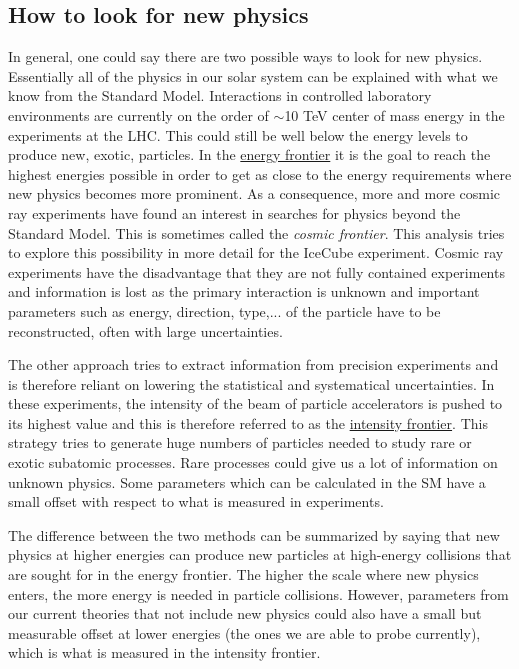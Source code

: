 \subsection{How to look for new physics}
In general, one could say there are two possible ways to look for new physics. Essentially all of the physics in our solar system can be explained with what we know from the Standard Model. Interactions in controlled laboratory environments are currently on the order of $\sim$10 TeV center of mass energy in the experiments at the LHC. This could still be well below the energy levels to produce new, exotic, particles. In the \underline{energy frontier} it is the goal to reach the highest energies possible in order to get as close to the energy requirements where new physics becomes more prominent. As a consequence, more and more cosmic ray experiments have found an interest in searches for physics beyond the Standard Model. This is sometimes called the \textit{cosmic frontier}. This analysis tries to explore this possibility in more detail for the IceCube experiment. Cosmic ray experiments have the disadvantage that they are not fully contained experiments and information is lost as the primary interaction is unknown and important parameters such as energy, direction, type,... of the particle have to be reconstructed, often with large uncertainties.

The other approach tries to extract information from precision experiments and is therefore reliant on lowering the statistical and systematical uncertainties. In these experiments, the intensity of the beam of particle accelerators is pushed to its highest value and this is therefore referred to as the \underline{intensity frontier}. This strategy tries to generate huge numbers of particles needed to study rare or exotic subatomic processes. Rare processes could give us a lot of information on unknown physics. Some parameters which can be calculated in the SM have a small offset with respect to what is measured in experiments.

The difference between the two methods can be summarized by saying that new physics at higher energies can produce new particles at high-energy collisions that are sought for in the energy frontier. The higher the scale where new physics enters, the more energy is needed in particle collisions. However, parameters from our current theories that not include new physics could also have a small but measurable offset at lower energies (the ones we are able to probe currently), which is what is measured in the intensity frontier. \\


